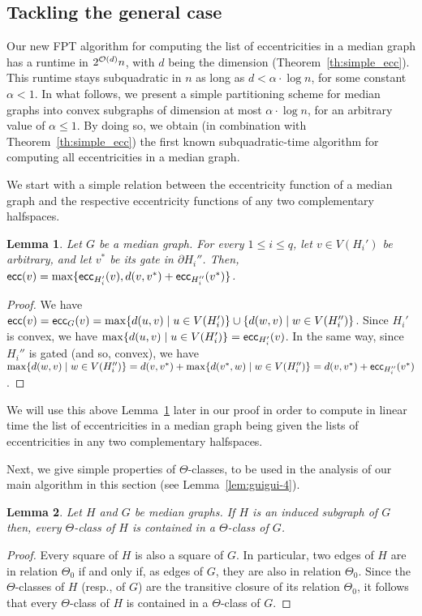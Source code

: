 \documentclass{article}
\newtheorem{lemma}{Lemma}
\newcommand{\ecc}{\mbox{\textsf{ecc}}}
\begin{document}
\subsection{Tackling the general case} \label{subsec:reduction}

Our new FPT algorithm for computing the list of eccentricities in a median graph has a runtime in $2^{{\cal O}(d)}n$, with $d$ being the dimension (Theorem~\ref{th:simple_ecc}). 
This runtime stays subquadratic in $n$ as long as $d < \alpha \cdot \log{n}$, for some constant $\alpha < 1$.
In what follows, we present a simple partitioning scheme for median graphs into convex subgraphs of dimension at most $\alpha \cdot \log{n}$, for an arbitrary value of $\alpha \leq 1$.
By doing so, we obtain (in combination with Theorem~\ref{th:simple_ecc}) the first known subquadratic-time algorithm for computing all eccentricities in a median graph.

We start with a simple relation between the eccentricity function of a median graph and the respective eccentricity functions of any two complementary halfspaces.

\begin{lemma}\label{lem:guigui-1}
Let $G$ be a median graph.
For every $1 \leq i \leq q$, let $v \in V(H_i')$ be arbitrary, and let $v^*$ be its gate in $\partial H_i''$.
Then, $\ecc(v) = \max\{\ecc_{H_i'}(v), d(v,v^*) + \ecc_{H_i''}(v^*)\}$.
\end{lemma}
\begin{proof}
We have $\ecc(v) = \ecc_G(v) = \max\{d(u,v) \mid u \in V(H_i')\} \cup \{d(w,v) \mid w \in V(H_i'')\}$.
Since $H_i'$ is convex, we have $\max\{d(u,v) \mid u \in V(H_i')\} = \ecc_{H_i'}(v)$.
In the same way, since $H_i''$ is gated (and so, convex), we have $\max\{d(w,v) \mid w \in V(H_i'')\} = d(v,v^*) + \max\{d(v^*,w) \mid w \in V(H_i'')\} = d(v,v^*) + \ecc_{H_i''}(v^*)$.
\end{proof}
We will use this above Lemma~\ref{lem:guigui-1} later in our proof in order to compute in linear time the list of eccentricities in a median graph being given the lists of eccentricities in any two complementary halfspaces.

Next, we give simple properties of $\Theta$-classes, to be used in the analysis of our main algorithm in this section (see Lemma~\ref{lem:guigui-4}).

\begin{lemma}\label{lem:guigui-2}
Let $H$ and $G$ be median graphs.
If $H$ is an induced subgraph of $G$ then, every $\Theta$-class of $H$ is contained in a $\Theta$-class of $G$.
\end{lemma}
\begin{proof}
Every square of $H$ is also a square of $G$.
In particular, two edges of $H$ are in relation $\Theta_0$ if and only if, as edges of $G$, they are also in relation $\Theta_0$.
Since the $\Theta$-classes of $H$ (resp., of $G$) are the transitive closure of its relation $\Theta_0$, it follows that every $\Theta$-class of $H$ is contained in a $\Theta$-class of $G$.
\end{proof}
\end{document}
